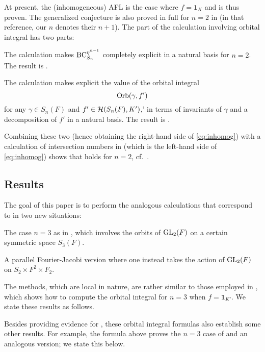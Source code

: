 At present, the (inhomogeneous) AFL is the case where $f = \mathbf{1}_K$ and is thus proven.
The generalized conjecture is also proved in full for
$n = 2$ in \cite[Theorem 1.0.1]{ref:AFLspherical}
(in that reference, our $n$ denotes their $n+1$).
The part of the calculation involving orbital integral has two parts:
\begin{itemize}
  \ii The calculation makes $\operatorname{BC}_{S_{n}}^{\eta^{n-1}}$
  completely explicit in a natural basis for $n = 2$.
  The result is \cite[Lemma 7.1.1]{ref:AFLspherical}.

  \ii The calculation makes explicit the value of the orbital integral
  \[ \operatorname{Orb}(\gamma, f') \]
  for any $\gamma \in S_n(F)$ and $f' \in \mathcal H(S_n(F), K')$,'
  in terms of invariants of $\gamma$ and a decomposition of $f'$ in a natural basis.
  The result is \cite[Proposition 7.3.2]{ref:AFLspherical}.
\end{itemize}
Combining these two (hence obtaining the right-hand side of \eqref{eq:inhomog})
with a calculation of intersection numbers in \cite[Corollary 7.4.3]{ref:AFLspherical}
(which is the left-hand side of \eqref{eq:inhomog})
shows that  holds for $n = 2$,
cf.\ \cite[Theorem 7.5.1]{ref:AFLspherical}.

\subsection{Results}
The goal of this paper is to perform the analogous calculations
that correspond to \cite[Lemma 7.1.1 and Proposition 7.3.2]{ref:AFLspherical}
in two new situations:
\begin{itemize}
  \ii The case $n = 3$ as in ,
  which involves the orbits of $\operatorname{GL}_2(F)$ on a certain symmetric space $S_3(F)$.

  \ii A parallel Fourier-Jacobi version where one instead takes the action
  of $\operatorname{GL}_2(F)$ on $S_2 \times F^2 \times F_2$.
\end{itemize}
The methods, which are local in nature,
are rather similar to those employed in \cite{ref:AFL},
which shows how to compute the orbital integral for $n = 3$ when $f = \mathbf{1}_{K'}$.
We state these results as follows.

\begin{theorem}
\end{theorem}

Besides providing evidence for ,
these orbital integral formulas also establish some other results.
For example, the formula above
proves the $n = 3$ case of \cite[Conjecture 8.2.1]{ref:AFLspherical}
and an analogous version; we state this below.

